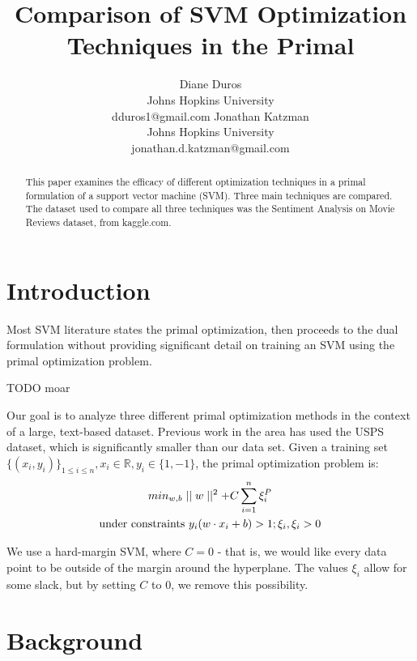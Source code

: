\documentclass[letterpaper, 11pt]{article}
\title{Comparison of SVM Optimization Techniques in the Primal}
\author{Diane Duros \\
	Johns Hopkins University\\
	dduros1@gmail.com
\And Jonathan Katzman\\
	Johns Hopkins University\\
	jonathan.d.katzman@gmail.com}
\begin{document}
\maketitle

\begin{abstract}
This paper examines the efficacy of different optimization techniques in a primal formulation of a support vector machine (SVM).  Three main techniques are compared.  The dataset used to compare all three techniques was the Sentiment Analysis on Movie Reviews dataset, from kaggle.com.
\end{abstract}
                                                                                                                                                                                                                                                                           
\section{Introduction}
Most SVM literature states the primal optimization, then proceeds to the dual formulation without providing significant detail on training an SVM using the primal optimization problem.  

TODO moar

Our goal is to analyze three different primal optimization methods in the context of a large, text-based dataset.  Previous work in the area\cite{chapelle2007training} has used the USPS dataset, which is significantly smaller than our data set.  Given a training set $\{ (x_i, y_i) \}_{1\le i\le n}, x_i \in \mathbb{R}, y_i \in \{1, -1\} $, the primal optimization problem is:
\begin{gather} min_{w,b} \mid \mid w \mid \mid ^2 + C\sum_{i=1}^n \xi_i^P\notag\\ 
\text{under constraints } y_i(w\cdot x_i + b) > 1; \xi_i, \xi_i > 0\label{primalobj}\end{gather}

We use a hard-margin SVM, where $C=0$ - that is, we would like every data point to be outside of the margin around the hyperplane.  The values $\xi_i$ allow for some slack, but by setting $C$ to $0$, we remove this possibility.

\section{Background}
\end{document}
